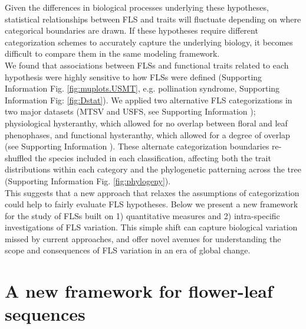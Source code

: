 \documentclass[11pt]{article}
\begin{document}
\noindent Given the differences in biological processes underlying these hypotheses, statistical relationships between FLS and traits will fluctuate depending on where categorical boundaries are drawn. %
If these hypotheses require different categorization schemes to accurately capture the underlying biology, it becomes difficult to compare them in the same modeling framework.\\

\noindent We found that associations between FLSs and functional traits related to each hypothesis were highly sensitive to how FLSs were defined (Supporting Information Fig. \ref{fig:muplots.USMT}, e.g. pollination syndrome, Supporting Information Fig: \ref{fig:Dstat}). We applied two alternative FLS categorizations in two major datasets (MTSV and USFS, see Supporting Information ); physiological hysteranthy, which allowed for no overlap between floral and leaf phenophases, and functional hysteranthy, which allowed for a degree of overlap (see Supporting Information ). These alternate categorization boundaries re-shuffled the species included in each classification, affecting both the trait distributions within each category and the phylogenetic patterning across the tree (Supporting Information Fig. \ref{fig:phylogeny}).\\ 
 
\noindent This suggests that a new approach that relaxes the assumptions of categorization could help to fairly evaluate FLS hypotheses. Below we present a new framework for the study of FLSs built on 1) quantitative measures and 2) intra-specific investigations of FLS variation. This simple shift can capture biological variation missed by current approaches, and offer novel avenues for understanding the scope and consequences of FLS variation in an era of global change.

 
\section*{A new framework for flower-leaf sequences} 
\end{document}
